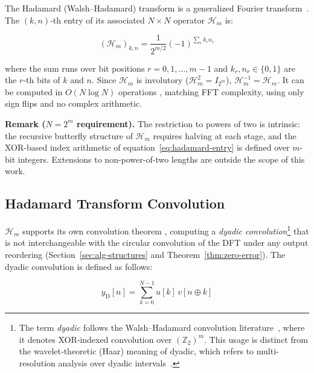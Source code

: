 \documentclass[11pt]{article}
\begin{document}
The Hadamard (Walsh--Hadamard) transform is a generalized Fourier transform~\cite{walsh1923closed, shanks1969ITCmp.100.457S, beauchamp1975walsh}. The $(k,n)$-th entry of its associated $N \times N$ operator $\mathcal{H}_m$ is:
 
 \begin{equation}                                      
 \label{eq:hadamard-entry}
   (\mathcal{H}_{m})_{k,n}={\frac {1}{2^{m/2}}}(-1)^{\sum _{r} k_{r} n_{r}}
\end{equation}

\noindent where the sum runs over bit positions $r = 0, 1, \ldots, m-1$ and $k_r, n_r \in \{0,1\}$ are the $r$-th bits of $k$ and $n$. Since $\mathcal{H}_m$ is involutory ($\mathcal{H}_{m}^2 = I_{2^m}$), $\mathcal{H}_m^{-1} = \mathcal{H}_m$. It can be computed in $O(N\log N)$ operations \cite{beauchamp1975walsh, fino1976unified}, matching FFT complexity, using only sign flips and no complex arithmetic.

\medskip
\noindent\textbf{Remark ($N = 2^m$ requirement).} The restriction to powers of two is intrinsic: the recursive butterfly structure of $\mathcal{H}_m$ requires halving at each stage, and the XOR-based index arithmetic of equation~\eqref{eq:hadamard-entry} is defined over $m$-bit integers. Extensions to non-power-of-two lengths are outside the scope of this work.

\subsection{Hadamard Transform Convolution}
\label{sec:hadamard-conv}

$\mathcal{H}_m$ supports its own convolution theorem \cite{doi:10.1049/el:19730172, beauchamp1975walsh, uvsakova2002walsh}, computing a \emph{dyadic convolution}\footnote{The term \emph{dyadic} follows the Walsh--Hadamard convolution literature~\cite{doi:10.1049/el:19730172, beauchamp1975walsh}, where it denotes XOR‑indexed convolution over $(\mathbb{Z}_2)^m$. This usage is distinct from the wavelet‑theoretic (Haar) meaning of dyadic, which refers to multi-resolution analysis over dyadic intervals~\cite{ahmed1975orthogonal}.} that is not interchangeable with the circular convolution of the DFT under any output reordering (Section~\ref{sec:alg-structures} and Theorem~\ref{thm:zero-error}). The dyadic convolution is defined as follows:

\begin{equation}
      \label{eq:dyadic-conv}
       y_{\mathrm{D}}[n] = \sum_{k=0}^{N-1} u[k]\,v[n \oplus k]
\end{equation}
\end{document}
